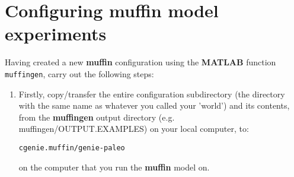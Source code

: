 \documentclass[11pt,fleqn]{book} %
\begin{document}

\newpage

\section{Configuring muffin model experiments}


Having created a new \textbf{muffin} configuration using the \textbf{MATLAB} function \texttt{muffingen}, carry out the following steps:

\vspace{2mm}
\begin{enumerate}

\vspace{1mm}
\item Firstly, copy/transfer the entire  configuration subdirectory (the directory with the same name as whatever you called your 'world')  and its contents, from the \textbf{muffingen} output directory (e.g. \textsf{\small muffingen/OUTPUT.EXAMPLES}) on your local computer, to:

\vspace{1mm}
\texttt{cgenie.muffin/genie-paleo}
\vspace{1mm}

\noindent on the computer that you run the \textbf{muffin} model on.


\end{enumerate}
\end{document}
